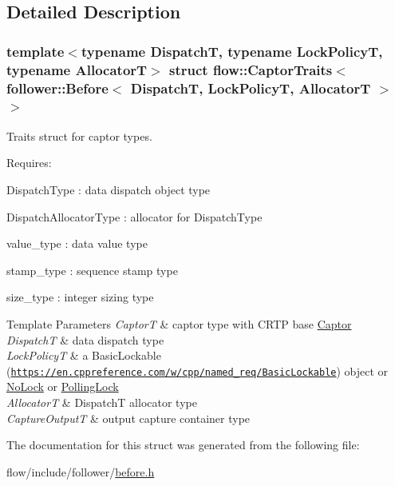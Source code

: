 \subsection{Detailed Description}
\subsubsection*{template$<$typename DispatchT, typename Lock\+PolicyT, typename AllocatorT$>$\newline
struct flow\+::\+Captor\+Traits$<$ follower\+::\+Before$<$ Dispatch\+T, Lock\+Policy\+T, Allocator\+T $>$ $>$}

Traits struct for captor types. 

Requires\+:
\begin{DoxyItemize}
\item {\ttfamily Dispatch\+Type} \+: data dispatch object type
\item {\ttfamily Dispatch\+Allocator\+Type} \+: allocator for {\ttfamily Dispatch\+Type}
\item {\ttfamily value\+\_\+type} \+: data value type
\item {\ttfamily stamp\+\_\+type} \+: sequence stamp type
\item {\ttfamily size\+\_\+type} \+: integer sizing type
\end{DoxyItemize}


\begin{DoxyTemplParams}{Template Parameters}
{\em CaptorT} & captor type with C\+R\+TP base {\ttfamily \hyperlink{classflow_1_1_captor}{Captor}}\\
\hline
{\em DispatchT} & data dispatch type \\
\hline
{\em Lock\+PolicyT} & a Basic\+Lockable (\href{https://en.cppreference.com/w/cpp/named_req/BasicLockable}{\tt https\+://en.\+cppreference.\+com/w/cpp/named\+\_\+req/\+Basic\+Lockable}) object or \hyperlink{structflow_1_1_no_lock}{No\+Lock} or \hyperlink{structflow_1_1_polling_lock}{Polling\+Lock} \\
\hline
{\em AllocatorT} & {\ttfamily DispatchT} allocator type \\
\hline
{\em Capture\+OutputT} & output capture container type \\
\hline
\end{DoxyTemplParams}


The documentation for this struct was generated from the following file\+:\begin{DoxyCompactItemize}
\item 
flow/include/follower/\hyperlink{before_8h}{before.\+h}\end{DoxyCompactItemize}
